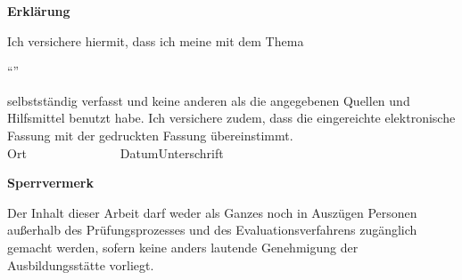 \newpage
\thispagestyle{empty}
\begin{framed}
    \begin{center}
        \Large\bfseries Erklärung
    \end{center}
    \medskip
    \noindent
    Ich versichere hiermit, dass ich meine \Typ{} mit dem Thema
    \begin{center}
        \enquote{\Titel}
    \end{center}
    selbstständig verfasst und keine anderen als die angegebenen Quellen und Hilfsmittel benutzt habe. Ich versichere zudem, dass die eingereichte elektronische Fassung mit der gedruckten Fassung übereinstimmt.
    \vspace{3cm}
    \vfill
    \noindent
    \underline{\hspace{6cm}}\hfill\underline{\hspace{6cm}}\\
    Ort~~~~~~~~~~~~~~~Datum\hfill  Unterschrift\hspace{4cm}
\end{framed}

\vfill
\begin{framed}
    \begin{center}
        \Large\bfseries Sperrvermerk
    \end{center}
    \medskip
    \noindent
    Der Inhalt dieser Arbeit darf weder als Ganzes noch in Auszügen Personen
    außerhalb des Prüfungsprozesses und des Evaluationsverfahrens zugänglich gemacht
    werden, sofern keine anders lautende Genehmigung der Ausbildungsstätte vorliegt.
\end{framed}